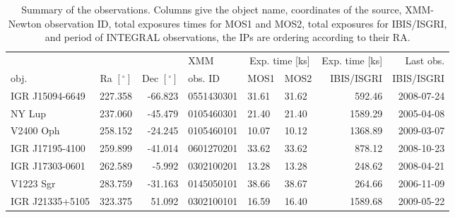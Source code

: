 \documentclass[oneside,a4paper,11pt]{report}
\begin{document}
\begin{table}
\begin{center}
\caption{Summary of the observations. Columns give the object name, coordinates of the source, XMM-Newton 
observation ID, total exposures times for MOS1 and MOS2, total exposures for IBIS/ISGRI, and period of INTEGRAL observations, 
the IPs are ordering according to their RA.}
\begin{tabular}{lrrlllrr}
\hline
\hline
     &     &     &XMM &\multicolumn{2}{c}{Exp. time [ks]}&Exp. time [ks]& Last obs.  \\
obj. & Ra $\mathrm{[^{\circ}]}$ & Dec $\mathrm{[^{\circ}]}$&obs. ID  & MOS1&MOS2& IBIS/ISGRI & IBIS/ISGRI \\ 
\hline
IGR J15094-6649&  227.358  & -66.823 & 0551430301&31.61     & 31.62& 592.46      &    2008-07-24                 \\
NY Lup         &  237.060  & -45.479 & 0105460301&21.40     & 21.40& 1589.29     &    2005-04-08                \\
V2400 Oph      &  258.152  & -24.245 & 0105460101&10.07     &10.12& 1368.89     &      2009-03-07                \\
IGR J17195-4100&  259.899  & -41.014 & 0601270201&33.62     &33.62&  878.12    &     2008-10-23              \\
IGR J17303-0601&  262.589  &  -5.992 & 0302100201&13.28     &13.28&   248.62   &       2008-04-21              \\
V1223 Sgr      &  283.759  & -31.163 & 0145050101&38.66     &38.67&   264.66  &     2006-11-09               \\
IGR J21335+5105&  323.375  &  51.092 & 0302100101&16.59     &16.40 & 1589.68    &  2009-05-22                   \\
\hline
\end{tabular}
\end{center}
\end{table}
\end{document}
